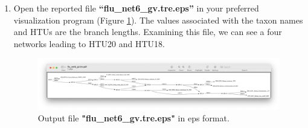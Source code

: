 \documentclass[11pt]{article}
\begin{document}
\begin {enumerate}
\item  Open the reported file \textbf{``flu\_net6\_gv.tre.eps''} in your preferred
visualization program (Figure \ref{eps6}). The values associated with the taxon 
names and HTUs are the branch lengths. Examining this file, we can see a four
networks leading to HTU20 and HTU18.

\begin{figure}[H]
\centering
\includegraphics[width=\textwidth]{eps6.png}
\caption{Output file \textbf{"flu\_net6\_gv.tre.eps"} in eps format.}
\label{eps6}
\end{figure}

%
\end{enumerate}


\end{document}
